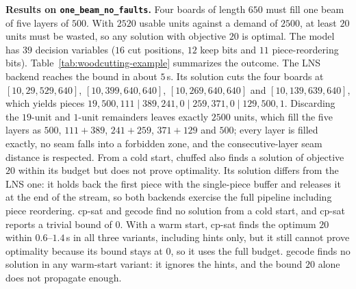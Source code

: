 \documentclass[11pt,a4paper]{article}
\begin{document}
\textbf{Results on \texttt{one\_beam\_no\_faults}.}
Four boards of length $650$ must fill one beam of five layers of $500$.
With $2520$ usable units against a demand of $2500$, at least $20$ units must
be wasted, so any solution with objective $20$ is optimal.
The model has $39$ decision variables ($16$ cut positions, $12$ keep bits and
$11$ piece-reordering bits).
Table~\ref{tab:woodcutting-example} summarizes the outcome.
The LNS backend reaches the bound in about $5$\,s.
Its solution cuts the four boards at
$[10,29,529,640]$, $[10,399,640,640]$, $[10,269,640,640]$ and
$[10,139,639,640]$, which yields pieces
$19, 500, 111 \mid 389, 241, 0 \mid 259, 371, 0 \mid 129, 500, 1$.
Discarding the $19$-unit and $1$-unit remainders leaves exactly $2500$ units,
which fill the five layers as $500$, $111+389$, $241+259$, $371+129$ and
$500$; every layer is filled exactly, no seam falls into a forbidden zone, and
the consecutive-layer seam distance is respected.
From a cold start, chuffed also finds a solution of objective $20$ within its
budget but does not prove optimality.
Its solution differs from the LNS one: it holds back the first piece with the
single-piece buffer and releases it at the end of the stream, so both
backends exercise the full pipeline including piece reordering.
cp-sat and gecode find no solution from a cold start, and cp-sat reports a
trivial bound of $0$.
With a warm start, cp-sat finds the optimum $20$ within $0.6$--$1.4$\,s in all
three variants, including hints only, but it still cannot prove optimality
because its bound stays at $0$, so it uses the full budget.
gecode finds no solution in any warm-start variant: it ignores the hints, and
the bound $20$ alone does not propagate enough.
\end{document}
